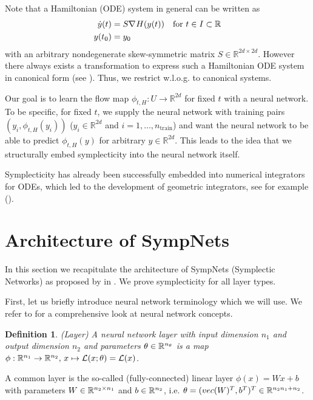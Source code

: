 \documentclass[twoside,a4paper]{article}
\newtheorem{definition}{Definition}
\begin{document}
Note that a Hamiltonian (ODE) system in general can be written as
\begin{align*}
	\dot{y}(t) &= S \nabla_{}{H}(y(t)) \quad \text{for } t \in I \subset \mathbb{R} \\
	y(t_0) &= y_0
\end{align*}
with an arbitrary nondegenerate skew-symmetric matrix $S \in \mathbb{R}^{2d \times 2d}$.
However there always exists a transformation to express such a Hamiltonian ODE system in
canonical form (see \citet[Remark 3.8]{peng2016}). Thus, we restrict w.l.o.g.
to canonical systems.

Our goal is to learn the flow map $\phi_{t,H} : U \to \mathbb{R}^{2d}$ for fixed $t$ with a neural network.
To be specific, for fixed $t$, we supply the neural network with training pairs $(y_i, \phi_{t,H}(y_i))$
($y_i \in \mathbb{R}^{2d}$ and $i=1, \dots, n_{\text{train}}$) and want the neural network
to be able to predict $\phi_{t,H}(y)$ for arbitrary $y \in \mathbb{R}^{2d}$.
This leads to the idea that we structurally embed symplecticity into the neural network itself.

Symplecticity has already been successfully embedded into numerical integrators for ODEs, which
led to the development of geometric integrators, see for example \citeauthor{hairer2006}
(\cite{hairer2006}).

\section{Architecture of SympNets}\label{sec_architecture_of_sympnets}

In this section we recapitulate the architecture of SympNets (Symplectic Networks) as
proposed by \citeauthor{Jin2020} in \cite{Jin2020}. We prove
symplecticity for all layer types.

First, let us briefly introduce neural network terminology which we will use.
We refer to \cite{Goodfellow2016} for a comprehensive look at neural
network concepts.

\begin{definition}
	(Layer)
	A neural network layer with input dimension $n_1$ and output dimension $n_2$
	and parameters $\theta \in \mathbb{R}^{n_\theta}$ is a map 
	$\phi : \mathbb{R}^{n_1} \to \mathbb{R}^{n_2},\, x \mapsto \mathcal{L}(x;\theta) = \mathcal{L}(x)$.
\end{definition}

A common layer is the so-called (fully-connected) linear layer
$\phi(x) = Wx +b$ with parameters $W \in \mathbb{R}^{n_2 \times n_1}$ and $b \in \mathbb{R}^{n_2}$,
i.e. $\theta = (vec(W)^T, b^T)^T \in \mathbb{R}^{n_2 n_1 + n_2}$.
\end{document}
